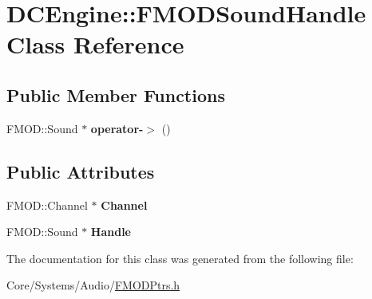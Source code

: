 \hypertarget{classDCEngine_1_1FMODSoundHandle}{\section{D\-C\-Engine\-:\-:F\-M\-O\-D\-Sound\-Handle Class Reference}
\label{classDCEngine_1_1FMODSoundHandle}
}
\subsection*{Public Member Functions}
\begin{DoxyCompactItemize}
\item 
\hypertarget{classDCEngine_1_1FMODSoundHandle_ac9a01e52033aceb3264f57e5d0e1bb31}{F\-M\-O\-D\-::\-Sound $\ast$ {\bfseries operator-\/$>$} ()}\label{classDCEngine_1_1FMODSoundHandle_ac9a01e52033aceb3264f57e5d0e1bb31}

\end{DoxyCompactItemize}
\subsection*{Public Attributes}
\begin{DoxyCompactItemize}
\item 
\hypertarget{classDCEngine_1_1FMODSoundHandle_a7ab824800a39a420a86e927976ba3aa1}{F\-M\-O\-D\-::\-Channel $\ast$ {\bfseries Channel}}\label{classDCEngine_1_1FMODSoundHandle_a7ab824800a39a420a86e927976ba3aa1}

\item 
\hypertarget{classDCEngine_1_1FMODSoundHandle_a1d4f22af1ec2b2474195492491d95284}{F\-M\-O\-D\-::\-Sound $\ast$ {\bfseries Handle}}\label{classDCEngine_1_1FMODSoundHandle_a1d4f22af1ec2b2474195492491d95284}

\end{DoxyCompactItemize}


The documentation for this class was generated from the following file\-:\begin{DoxyCompactItemize}
\item 
Core/\-Systems/\-Audio/\hyperlink{FMODPtrs_8h}{F\-M\-O\-D\-Ptrs.\-h}\end{DoxyCompactItemize}

